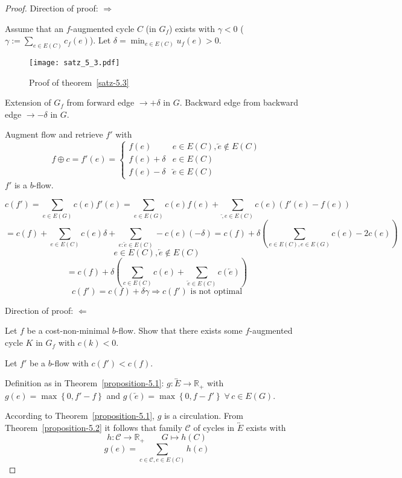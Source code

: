 \documentclass{article}
\newcommand{\set}[1]{\left\{#1\right\}}
\newcommand{\fall}{\;\forall\,}
\begin{document}
\begin{proof}
  Direction of proof: $\Rightarrow$

  Assume that an $f$-augmented cycle $C$ (in $G_f$) exists with $\gamma < 0$ ($\gamma := \sum_{e \in E(C)} c_f(e)$). Let $\delta = \min_{e \in E(C)} u_f(e) > 0$.

  \begin{figure}[h]
   \begin{center}
    \texttt{[image: satz\_5\_3.pdf]}
    \caption{Proof of theorem~\ref{satz-5.3}}
   \end{center}
  \end{figure}

  Extension of $G_f$ from forward edge $\rightarrow +\delta$ in $G$. Backward edge from backward edge $\rightarrow -\delta$ in $G$.

  Augment flow and retrieve $f'$ with
  \[
    f \oplus c = f'(e) = \begin{cases}
      f(e)      & e \in E(C), \overleftarrow{e} \notin E(C) \\
      f(e) + \delta    & e \in E(C) \\
      f(e) - \delta    & \overleftarrow{e} \in E(C)
    \end{cases}
  \]
  $f'$ is a $b$-flow.

  \[
    c(f') = \sum_{e \in E(G)} c(e) f'(e) = \sum_{e \in E(G)} c(e) f(e) + \sum_{\overleftarrow, e \in E(C)} c(e)(f'(e) - f(e))
  \] \[
    = c(f) + \sum_{e \in E(C)} c(e) \delta + \sum_{e: \overleftarrow{e} \in E(C)} -c(e)(-\delta)
    = c(f) + \delta\left(\sum_{e \in E(C), e \in E(G)} c(e) - 2c(e)\right)
  \] \[
    e \in E(C), \overleftarrow{e} \notin E(C)
  \] \[
    = c(f) + \delta\left(\sum_{c \in E(C)} c(e) + \sum_{\overleftarrow{e} \in E(C)} c(\overleftarrow{e}) \right)
  \] \[
    c(f') = c(f) + \delta\gamma \Rightarrow c(f') \text{ is not optimal}
  \]

  Direction of proof: $\Leftarrow$

  Let $f$ be a cost-non-minimal $b$-flow. Show that there exists some $f$-augmented cycle $K$ in $G_f$ with $c(k) < 0$.

  Let $f'$ be a $b$-flow with $c(f') < c(f)$.

  Definition as in Theorem~\ref{proposition-5.1}: $g: \overleftrightarrow{E} \rightarrow \mathbb{R}_+$ with $g(e) = \max\set{0, f' - f}$ and $g(\overleftarrow{e}) = \max\set{0, f - f'} \fall c \in E(G)$.

  According to Theorem~\ref{proposition-5.1}, $g$ is a circulation. From Theorem~\ref{proposition-5.2} it follows that family $\mathcal{C}$ of cycles in $\overleftrightarrow{E}$ exists with
  \[
    h: \mathcal{C} \rightarrow \mathbb{R}_+  \qquad G \mapsto h(C)
  \] \[
    g(e) = \sum_{c \in \mathcal{C}, e \in E(C)} h(c)
  \]


\end{proof}
\end{document}
